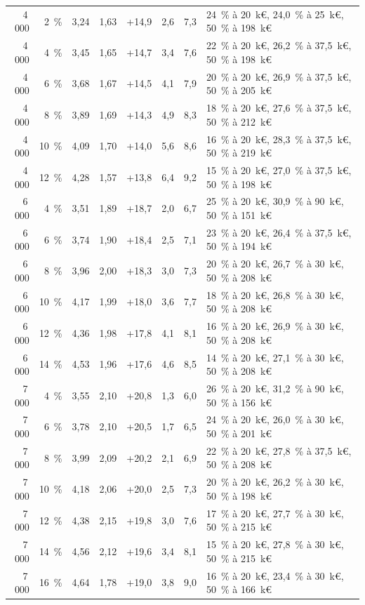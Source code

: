 \documentclass[11pt,a4paper]{article}
\begin{document}
\begin{table}[!htbp]
{\begin{tabular}{@{}rrrrrrrl@{}}
4\,000 & 2~\% & 3,24 & 1,63 & +14,9 & 2,6 & 7,3 & 24~\% à 20~k€, 24,0~\% à 25~k€, 50~\% à 198~k€ \\
4\,000 & 4~\% & 3,45 & 1,65 & +14,7 & 3,4 & 7,6 & 22~\% à 20~k€, 26,2~\% à 37,5~k€, 50~\% à 198~k€ \\
4\,000 & 6~\% & 3,68 & 1,67 & +14,5 & 4,1 & 7,9 & 20~\% à 20~k€, 26,9~\% à 37,5~k€, 50~\% à 205~k€ \\
4\,000 & 8~\% & 3,89 & 1,69 & +14,3 & 4,9 & 8,3 & 18~\% à 20~k€, 27,6~\% à 37,5~k€, 50~\% à 212~k€ \\
4\,000 & 10~\% & 4,09 & 1,70 & +14,0 & 5,6 & 8,6 & 16~\% à 20~k€, 28,3~\% à 37,5~k€, 50~\% à 219~k€ \\
4\,000 & 12~\% & 4,28 & 1,57 & +13,8 & 6,4 & 9,2 & 15~\% à 20~k€, 27,0~\% à 37,5~k€, 50~\% à 198~k€ \\
6\,000 & 4~\% & 3,51 & 1,89 & +18,7 & 2,0 & 6,7 & 25~\% à 20~k€, 30,9~\% à 90~k€, 50~\% à 151~k€ \\
6\,000 & 6~\% & 3,74 & 1,90 & +18,4 & 2,5 & 7,1 & 23~\% à 20~k€, 26,4~\% à 37,5~k€, 50~\% à 194~k€ \\
6\,000 & 8~\% & 3,96 & 2,00 & +18,3 & 3,0 & 7,3 & 20~\% à 20~k€, 26,7~\% à 30~k€, 50~\% à 208~k€ \\
6\,000 & 10~\% & 4,17 & 1,99 & +18,0 & 3,6 & 7,7 & 18~\% à 20~k€, 26,8~\% à 30~k€, 50~\% à 208~k€ \\
6\,000 & 12~\% & 4,36 & 1,98 & +17,8 & 4,1 & 8,1 & 16~\% à 20~k€, 26,9~\% à 30~k€, 50~\% à 208~k€ \\
6\,000 & 14~\% & 4,53 & 1,96 & +17,6 & 4,6 & 8,5 & 14~\% à 20~k€, 27,1~\% à 30~k€, 50~\% à 208~k€ \\
7\,000 & 4~\% & 3,55 & 2,10 & +20,8 & 1,3 & 6,0 & 26~\% à 20~k€, 31,2~\% à 90~k€, 50~\% à 156~k€ \\
7\,000 & 6~\% & 3,78 & 2,10 & +20,5 & 1,7 & 6,5 & 24~\% à 20~k€, 26,0~\% à 30~k€, 50~\% à 201~k€ \\
7\,000 & 8~\% & 3,99 & 2,09 & +20,2 & 2,1 & 6,9 & 22~\% à 20~k€, 27,8~\% à 37,5~k€, 50~\% à 208~k€ \\
7\,000 & 10~\% & 4,18 & 2,06 & +20,0 & 2,5 & 7,3 & 20~\% à 20~k€, 26,2~\% à 30~k€, 50~\% à 198~k€ \\
7\,000 & 12~\% & 4,38 & 2,15 & +19,8 & 3,0 & 7,6 & 17~\% à 20~k€, 27,7~\% à 30~k€, 50~\% à 215~k€ \\
7\,000 & 14~\% & 4,56 & 2,12 & +19,6 & 3,4 & 8,1 & 15~\% à 20~k€, 27,8~\% à 30~k€, 50~\% à 215~k€ \\
7\,000 & 16~\% & 4,64 & 1,78 & +19,0 & 3,8 & 9,0 & 16~\% à 20~k€, 23,4~\% à 30~k€, 50~\% à 166~k€ \\

\end{tabular}}
\end{table}
\end{document}
